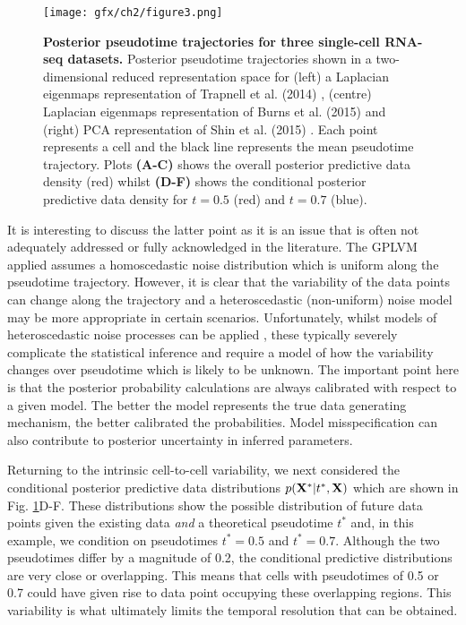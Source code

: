 \begin{figure}
\centering
	\texttt{[image: gfx/ch2/figure3.png]}
  	\caption{{\bf Posterior pseudotime trajectories for three single-cell RNA-seq datasets.} Posterior pseudotime trajectories shown in a two-dimensional reduced representation space for (left) a Laplacian eigenmaps representation of Trapnell et al. (2014) \cite{Trapnell2014}, (centre) Laplacian eigenmaps representation of Burns et al. (2015) \cite{Burns2015} and (right) PCA representation of Shin et al. (2015) \cite{Shin2015}. Each point represents a cell and the black line represents the mean pseudotime trajectory. Plots \textbf{(A-C)} shows the overall posterior predictive data density (red) whilst \textbf{(D-F)} shows the conditional posterior predictive data density for $t = 0.5$ (red) and $t = 0.7$ (blue). }
  	\label{fig:posmean}
\end{figure}

It is interesting to discuss the latter point as it is an issue that is often not adequately addressed or fully acknowledged in the literature. The GPLVM applied assumes a homoscedastic noise distribution which is uniform along the pseudotime trajectory. However, it is clear that the variability of the data points can change along the trajectory and a heteroscedastic (non-uniform) noise model may be more appropriate in certain scenarios. Unfortunately, whilst models of heteroscedastic noise processes can be applied \cite{le2005heteroscedastic}, these typically severely complicate the statistical inference and require a model of how the variability changes over pseudotime which is likely to be unknown. The important point here is that the posterior probability calculations are always calibrated with respect to a given model. The better the model represents the true data generating mechanism, the better calibrated the probabilities. Model misspecification can also contribute to posterior uncertainty in inferred parameters.

Returning to the intrinsic cell-to-cell variability, we next considered the conditional posterior predictive data distributions $p({\bf X}^*|t^*, {\bf X})$ which are shown in Fig. \ref{fig:posmean}D-F. These distributions show the possible distribution of future data points given the existing data \emph{and} a theoretical pseudotime $t^*$ and, in this example, we condition on pseudotimes $t^* = 0.5$ and $t^* = 0.7$. Although the two pseudotimes differ by a magnitude of 0.2, the conditional predictive distributions are very close or overlapping. This means that cells with pseudotimes of 0.5 or 0.7 could have given rise to data point occupying these overlapping regions. This variability is what ultimately limits the temporal resolution that can be obtained.

